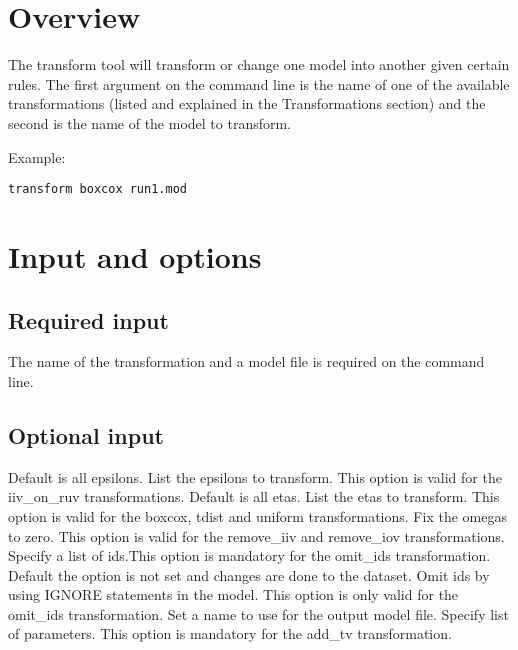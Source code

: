 
\usepackage{hyperref}


\maketitle
\newcommand{\guidetoolname}{transform}
\tableofcontents
\newpage

\section{Overview}
The transform tool will transform or change one model into another given certain rules. The first argument on the command line is the name of one of the available transformations (listed and explained in the Transformations section) and the second is the name of the model to transform.

Example:
\begin{verbatim}
transform boxcox run1.mod
\end{verbatim}

\section{Input and options}

\subsection{Required input}
The name of the transformation and a model file is required on the command line.

\subsection{Optional input}

\begin{optionlist}

Default is all epsilons. List the epsilons to transform. This option is valid for the iiv\_on\_ruv transformations.
\nextopt
{}
Default is all etas. List the etas to transform. This option is valid for the boxcox, tdist and uniform transformations.
\nextopt
{}
Fix the omegas to zero. This option is valid for the remove\_iiv and remove\_iov transformations.
\nextopt
{}
Specify a list of ids.This option is mandatory for the omit\_ids transformation.
\nextopt
{}
Default the option is not set and changes are done to the dataset. Omit ids by using IGNORE statements in the model. This option is only valid for the omit\_ids transformation.
\nextopt
{}
Set a name to use for the output model file. 
\nextopt
{}
Specify list of parameters. This option is mandatory for the add\_tv transformation.
\nextopt
\end{optionlist}

